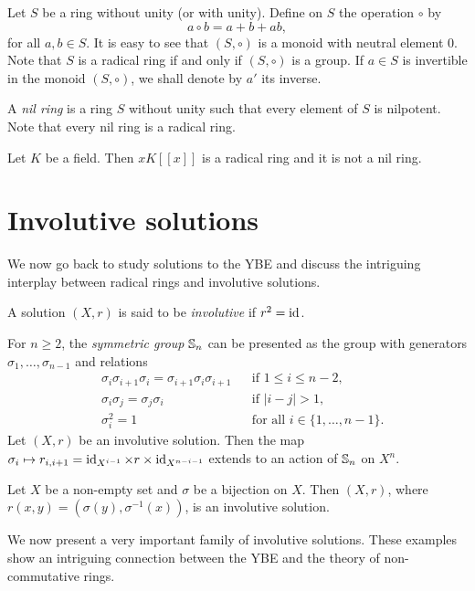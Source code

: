 Let $S$ be a ring without unity (or with unity).
Define on $S$ the operation $\circ$ by
$$a\circ b=a+b+ab,$$
for all $a,b\in S$. It is easy to see that $(S,\circ)$ is a monoid with neutral element $0$.
Note that $S$ is a radical ring if and only if $(S,\circ)$ is a group. If $a\in S$ is invertible in the monoid $(S,\circ)$, we shall denote by $a'$ its inverse.

A {\em nil ring} is a ring $S$ without unity such that every element of $S$ is nilpotent. Note that every nil ring is a radical ring.

\begin{example} Let $K$ be a field. Then $xK[[x]]$ is a radical ring and it is not a nil ring.
	\end{example}

\section*{Involutive solutions}

We now go back to study solutions to the YBE and discuss the intriguing interplay
between radical rings and involutive solutions. 

\begin{definition}
	A solution $(X,r)$ is said to be \emph{involutive} if $r^2=\operatorname{id}$. 
\end{definition}

For $n\geq2$, the \emph{symmetric group} $\mathbb{S}_n$ can be presented 
as the group with generators $\sigma_1,\dots,\sigma_{n-1}$ and relations
\begin{align*}
	&\sigma_i\sigma_{i+1}\sigma_i=\sigma_{i+1}\sigma_i\sigma_{i+1} && \text{if }1\leq i\leq n-2,\\
	&\sigma_i\sigma_j=\sigma_j\sigma_i && \text{if }|i-j|> 1,\\
	&\sigma_i^2=1 && \text{for all $i\in\{1,\dots,n-1\}$}.
\end{align*}
Let $(X,r)$ be an involutive solution. 
Then the map $\sigma_i\mapsto r_{i,i+1}=\operatorname{id}_{X^{i-1}}\times r\times\operatorname{id}_{X^{n-i-1}}$ extends 
to an action of $\mathbb{S}_n$ on $X^n$.

\begin{example}
	Let $X$ be a non-empty set and $\sigma$ be a bijection on $X$. Then 
	$(X,r)$, where $r(x,y)=(\sigma(y),\sigma^{-1}(x))$, is an involutive solution. 
\end{example}

We now present a very important family of involutive solutions. 
These examples show an intriguing connection between the YBE and the 
theory of non-commutative rings. 


